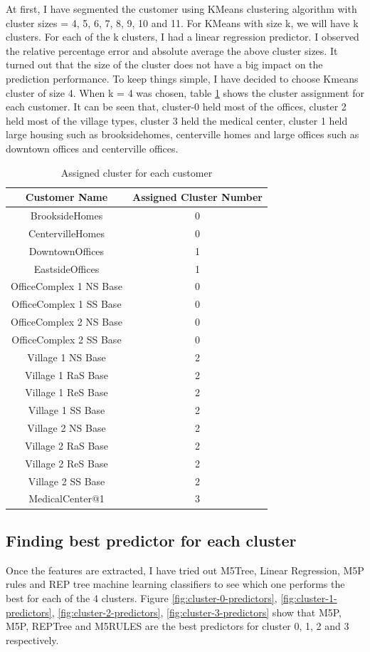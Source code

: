 At first, I have segmented the customer using KMeans clustering algorithm with cluster sizes = 4, 5, 6, 7, 8, 9, 10 and 11. For KMeans with size k, we will have k clusters. For each of the k clusters, I had a linear regression predictor. I observed the relative percentage error and absolute average the above cluster sizes. It turned out that the size of the cluster does not have a big impact on the prediction performance. To keep things simple, I have decided to choose Kmeans cluster of size 4. When k = 4 was chosen, table \ref{table:clusterAss} shows the cluster assignment for each customer. It can be seen that, cluster-0 held most of the offices, cluster 2 held most of the village types, cluster 3 held the medical center, cluster 1 held large housing such as brooksidehomes, centerville homes and large offices such as downtown offices and centerville offices.


\begin{table}[h!]
\centering
\begin{tabular}{|c| c|} 
 \hline
 Customer Name & Assigned Cluster Number \\ [0.5ex] 
 \hline
BrooksideHomes &	0 \\
CentervilleHomes & 0 \\
DowntownOffices & 1	\\
EastsideOffices &	1 \\
OfficeComplex 1 NS Base &	0 \\
OfficeComplex 1 SS Base &	0 \\
OfficeComplex 2 NS Base &	0 \\
OfficeComplex 2 SS Base &	0 \\
Village 1 NS Base &	2 \\
Village 1 RaS Base &	2 \\
Village 1 ReS Base &	2 \\
Village 1 SS Base &	2 \\
Village 2 NS Base &	2 \\
Village 2 RaS Base &	2 \\
Village 2 ReS Base &	2 \\
Village 2 SS Base &	2 \\
MedicalCenter@1	& 3 \\ [1ex] 
 \hline
\end{tabular}
\caption{Assigned cluster for each customer}
\label{table:clusterAss}
\end{table}

\subsection {Finding best predictor for each cluster}
Once the features are extracted, I have tried out  M5Tree, Linear Regression, M5P rules and REP tree machine learning classifiers to see which one performs the best for each of the 4 clusters. Figure \ref{fig:cluster-0-predictors}, \ref{fig:cluster-1-predictors}, \ref{fig:cluster-2-predictors}, \ref{fig:cluster-3-predictors} show that M5P, M5P, REPTree and M5RULES are the best predictors for cluster 0, 1, 2 and 3 respectively.

